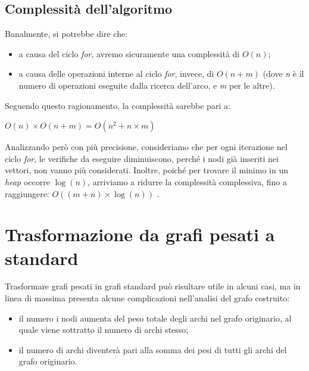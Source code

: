 \subsection{Complessità dell'algoritmo}
Banalmente, si potrebbe dire che:
\begin{itemize}
    \item a causa del ciclo \textit{for}, avremo sicuramente una complessità di $O(n)$;
    \item a causa delle operazioni interne al ciclo \textit{for}, invece, di $O(n+m)$ (dove \textit{n} è il numero di operazioni eseguite dalla ricerca dell'arco, e \textit{m} per le altre).
\end{itemize}
Seguendo questo ragionamento, la complessità sarebbe pari a:
\begin{center}
    $ O(n)\times O(n+m) = O(n^2 + n\times m) $
\end{center}
Analizzando però con più precisione, consideriamo che per ogni iterazione nel ciclo \textit{for}, le verifiche da eseguire diminuiscono, perché i nodi già inseriti nei vettori, non vanno più considerati. Inoltre, poiché per trovare il minimo in un \textit{heap} occorre $\log(n)$, arriviamo a ridurre la complessità complessiva, fino a raggiungere: $O((m+n)\times \log(n))$ .

\section{Trasformazione da grafi pesati a standard}
Trasformare grafi pesati in grafi standard può risultare utile in alcuni casi, ma in linea di massima presenta alcune complicazioni nell'analisi del grafo costruito:
\begin{itemize}
    \item il numero i nodi aumenta del peso totale degli archi nel grafo originario, al quale viene sottratto il numero di archi stesso;
    \item il numero di archi diventerà pari alla somma dei pesi di tutti gli archi del grafo originario.
\end{itemize}